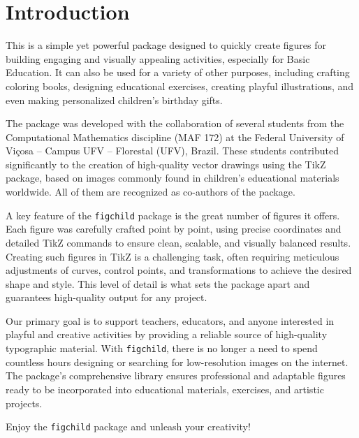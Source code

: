 \documentclass[x11names]{article}
\begin{document}
	\tableofcontents
	
	\clearpage
	\listoftables
	
	\clearpage
	
	\section{Introduction}
	
	\hspace{\parindent}This is a simple yet powerful package designed to quickly create figures for building engaging and visually appealing activities, especially for Basic Education. It can also be used for a variety of other purposes, including crafting coloring books, designing educational exercises, creating playful illustrations, and even making personalized children’s birthday gifts.
	
	The package was developed with the collaboration of several students from the Computational Mathematics discipline (MAF 172) at the Federal University of Viçosa – Campus UFV – Florestal (UFV), Brazil. These students contributed significantly to the creation of high-quality vector drawings using the TikZ package, based on images commonly found in children’s educational materials worldwide. All of them are recognized as co-authors of the package.
	
	A key feature of the \texttt{figchild} package is the great number of figures it offers. Each figure was carefully crafted point by point, using precise coordinates and detailed TikZ commands to ensure clean, scalable, and visually balanced results. Creating such figures in TikZ is a challenging task, often requiring meticulous adjustments of curves, control points, and transformations to achieve the desired shape and style. This level of detail is what sets the package apart and guarantees high-quality output for any project.
	
	Our primary goal is to support teachers, educators, and anyone interested in playful and creative activities by providing a reliable source of high-quality typographic material. With \texttt{figchild}, there is no longer a need to spend countless hours designing or searching for low-resolution images on the internet. The package’s comprehensive library ensures professional and adaptable figures ready to be incorporated into educational materials, exercises, and artistic projects.
	
	Enjoy the \texttt{figchild} package and unleash your creativity!
	
\end{document}
